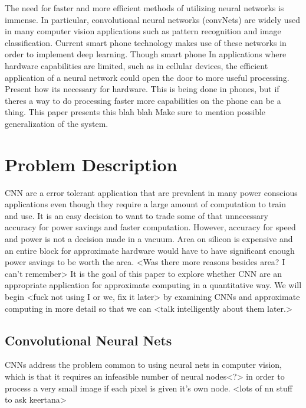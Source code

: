 \documentclass[conference]{IEEEtran}
\begin{document}
	\indent The need for faster and more efficient methods of utilizing neural networks is immense. In particular, convolutional neural networks (convNets) are widely used in many computer vision applications such as pattern recognition and image classification. Current smart phone technology makes use of these networks in order to implement deep learning. Though smart phone In applications where hardware capabilities are limited, such as in cellular devices, the efficient application of a neural network could open the door to more useful processing.  \\
	Present how its necessary for hardware. This is being done in phones, but if theres a way to do processing faster more capabilities on the phone can be a thing. 
	This paper presents this blah blah 
	Make sure to mention possible generalization of the system. 
	
	
	
\section{Problem Description}
CNN are a error tolerant application that are prevalent in many power conscious applications even though they require a large amount of computation to train and use. It is an easy decision to want to trade some of that unnecessary accuracy for power savings and faster computation. However, accuracy for speed and power is not a decision made in a vacuum. Area on silicon is expensive and an entire block for approximate hardware would have to have significant enough power savings to be worth the area. <Was there more reasons besides area? I can't remember> It is the goal of this paper to explore whether CNN are an appropriate application for approximate computing in a quantitative way. We will begin <fuck not using I or we, fix it later> by examining CNNs and approximate computing in more detail so that we can <talk intelligently about them later.>
\subsection{Convolutional Neural Nets}
CNNs address the problem common to using neural nets in computer vision, which is that it requires an infeasible number of neural nodes<?> in order to process a very small image if each pixel is given it's own node. <lots of nn stuff to ask keertana>
\end{document}
